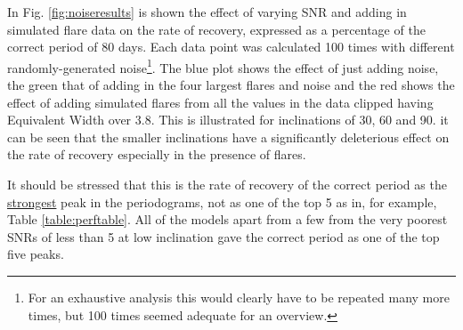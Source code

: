 In Fig. \ref{fig:noiseresults} is shown the effect of varying SNR and adding in simulated flare data on the rate of
recovery, expressed as a percentage of the correct period of 80 days. Each data point was calculated 100 times with
different randomly-generated noise\footnote{For an exhaustive analysis this would clearly have to be repeated many more
  times, but 100 times seemed adequate for an overview.}. The blue plot shows the effect of just adding
noise, the green that of adding in the four largest flares and noise and the red shows the effect of adding simulated
flares from all the values in the {\harps} data clipped having Equivalent Width over 3.8. This is illustrated for
inclinations of 30{\degree}, 60{\degree} and 90{\degree}. it can be seen that the smaller inclinations have a
significantly deleterious effect on the rate of recovery especially in the presence of flares.

It should be stressed that this is the rate of recovery of the correct period as the \underline{strongest} peak in the
periodograms, not as one of the top 5 as in, for example, Table \ref{table:perftable}. All of the models apart from a
few from the very poorest SNRs of less than 5 at low inclination gave the correct period as one of the top five peaks.


